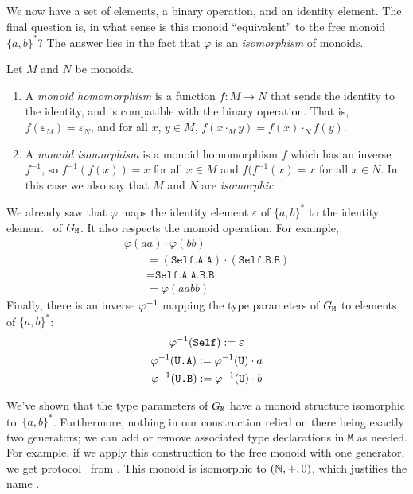 \documentclass[../generics]{subfiles}
\begin{document}
We now have a set of elements, a binary operation, and an identity element. The final question is, in what sense is this monoid ``equivalent'' to the free monoid $\{a,b\}^*$? The answer lies in the fact that $\varphi$ is an \emph{isomorphism} of monoids.

\begin{definition}
Let $M$ and $N$ be monoids.
\begin{enumerate}
\item A \emph{monoid homomorphism} is a function $f\colon M\rightarrow N$ that sends the identity to the identity, and is compatible with the binary operation. That is, $f(\varepsilon_M)=\varepsilon_N$, and for all $x$, $y\in M$, $f(x\cdot_M y)=f(x)\cdot_N f(y)$.
\item A \emph{monoid isomorphism} is a monoid homomorphism $f$ which has an inverse $f^{-1}$, so $f^{-1}(f(x))=x$ for all $x\in M$ and $f(f^{-1}(x)=x$ for all $x\in N$. In this case we also say that $M$ and $N$ are \emph{isomorphic}.
\end{enumerate}
\end{definition}

We already saw that $\varphi$ maps the identity element $\varepsilon$ of $\{a,b\}^*$ to the identity element \tSelf\ of $G_\texttt{M}$. It also respects the monoid operation. For example,
\begin{gather*}
\varphi(aa)\cdot\varphi(bb)\\
\qquad {}=(\texttt{Self.A.A})\cdot(\texttt{Self.B.B})\\
\qquad {}=\texttt{Self.A.A.B.B}\\
\qquad {}=\varphi(aabb)
\end{gather*}
Finally, there is an inverse $\varphi^{-1}$ mapping the type parameters of $G_\texttt{M}$ to elements of $\{a,b\}^*$:
\begin{gather*}
\varphi^{-1}(\texttt{Self}):=\varepsilon\\
\varphi^{-1}(\texttt{U.A}):=\varphi^{-1}(\texttt{U})\cdot a\\
\varphi^{-1}(\texttt{U.B}):=\varphi^{-1}(\texttt{U})\cdot b
\end{gather*}

We've shown that the type parameters of $G_\texttt{M}$ have a monoid structure isomorphic to~$\{a,b\}^*$. Furthermore, nothing in our construction relied on there being exactly two generators; we can add or remove associated type declarations in \texttt{M} as needed. For example, if we apply this construction to the free monoid with one generator, we get protocol \tN\ from . This monoid is isomorphic to $(\mathbb{N},+,0)$, which justifies the name \tN.
\end{document}
